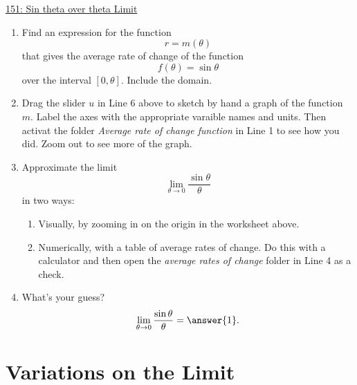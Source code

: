 \documentclass{ximera}
\begin{document}
\begin{example}  \label{Ex8f7fd3lgzmq}
\begin{onlineOnly}
    \begin{center}
\end{center}
\end{onlineOnly}

\href{https://www.desmos.com/calculator/xv3rn3tyxx}{151: Sin theta over theta Limit}

\begin{enumerate}
\item Find an expression for the function
\[
      r = m(\theta)
\]
that gives the average rate of change of the function
\[
     f(\theta) = \sin \theta
\]
over the interval $[0,\theta]$. Include the domain.

\item Drag the slider $u$ in Line 6 above to sketch by hand a graph of the function $m$. Label the axes with the appropriate varaible names and units. Then activat the folder \emph{Average rate of change function} in Line 1 to see how you did. Zoom out to see more of the graph.

\item Approximate the limit
\[
     \lim_{\theta \to 0} \frac{\sin\theta}{\theta}
\]
in two ways:

\begin{enumerate}
\item Visually, by zooming in on the origin in the worksheet above.

\item Numerically, with a table of average rates of change. Do this with a calculator and then open the \emph{average rates of change} folder in Line 4 as a check.
\end{enumerate}

\item What's your guess?
\[
   \lim_{\theta \to 0} \frac{\sin\theta}{\theta} = \answer{1} .
\]

\end{enumerate}
\end{example}

\section{Variations on the Limit}
\end{document}
